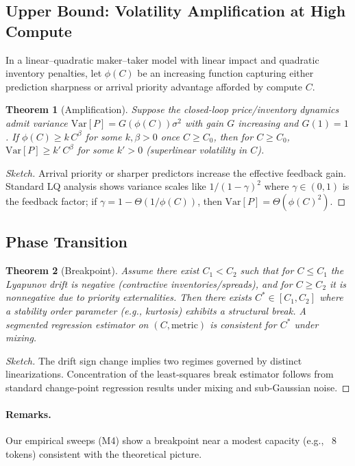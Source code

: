\documentclass[11pt]{article}
\newtheorem{theorem}{Theorem}
\begin{document}
\subsection*{Upper Bound: Volatility Amplification at High Compute}

In a linear–quadratic maker–taker model with linear impact and quadratic inventory penalties, let $\phi(C)$ be an increasing function capturing either prediction sharpness or arrival priority advantage afforded by compute $C$.

\begin{theorem}[Amplification]
Suppose the closed-loop price/inventory dynamics admit variance $\mathrm{Var}[P] = G(\phi(C))\sigma^2$ with gain $G$ increasing and $G(1)=1$. If $\phi(C)\ge k\, C^{\beta}$ for some $k,\beta>0$ once $C\ge C_0$, then for $C\ge C_0$, $\mathrm{Var}[P]\ge k'\, C^{\beta}$ for some $k'>0$ (superlinear volatility in $C$).
\end{theorem}

\begin{proof}[Sketch]
Arrival priority or sharper predictors increase the effective feedback gain. Standard LQ analysis shows variance scales like $1/(1-\gamma)^2$ where $\gamma\in(0,1)$ is the feedback factor; if $\gamma=1-\Theta(1/\phi(C))$, then $\mathrm{Var}[P]=\Theta(\phi(C)^2)$.
\end{proof}

\subsection*{Phase Transition}

\begin{theorem}[Breakpoint]
Assume there exist $C_1<C_2$ such that for $C\le C_1$ the Lyapunov drift is negative (contractive inventories/spreads), and for $C\ge C_2$ it is nonnegative due to priority externalities. Then there exists $C^*\in[C_1,C_2]$ where a stability order parameter (e.g., kurtosis) exhibits a structural break. A segmented regression estimator on $(C,\mathrm{metric})$ is consistent for $C^*$ under mixing.
\end{theorem}

\begin{proof}[Sketch]
The drift sign change implies two regimes governed by distinct linearizations. Concentration of the least-squares break estimator follows from standard change-point regression results under mixing and sub-Gaussian noise.
\end{proof}

\paragraph{Remarks.} Our empirical sweeps (M4) show a breakpoint near a modest capacity (e.g., ~8 tokens) consistent with the theoretical picture.
\end{document}
